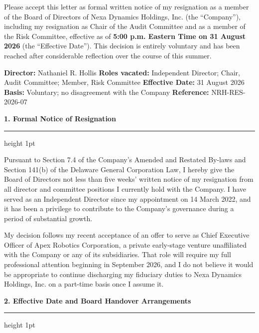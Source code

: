 \documentclass[english,11pt]{g-brief}
\newcommand{\lettersection}[1]{%
  \vspace{2.5mm}%
  {\color{BoardNavy}\Large\bfseries #1}\par%
  \vspace{0.5mm}%
  {\color{BrassGold}\hrule height 1pt}\par%
  \vspace{1.5mm}%
}
\begin{document}
\begin{g-brief}

Please accept this letter as formal written notice of my resignation as a member of the Board of Directors of Nexa Dynamics Holdings, Inc. (the ``Company''), including my resignation as Chair of the Audit Committee and as a member of the Risk Committee, effective as of \textbf{5:00 p.m. Eastern Time on 31 August 2026} (the ``Effective Date''). This decision is entirely voluntary and has been reached after considerable reflection over the course of this summer.

\vspace{2.5mm}
\begin{tcolorbox}[
    colback=ParchmentBG,
    colframe=BoardNavy,
    boxrule=1pt,
    arc=1.5mm,
    top=2.5mm,
    bottom=2.5mm,
    left=3.5mm,
    right=3.5mm,
    title=\textcolor{white}{\small\faFile\ \textbf{Notice Summary --- For the Record}}
]
\textcolor{DarkText}{%
\textbf{Director:} Nathaniel R. Hollis \quad\textbullet\quad
\textbf{Roles vacated:} Independent Director; Chair, Audit Committee; Member, Risk Committee \quad\textbullet\quad
\textbf{Effective Date:} 31 August 2026 \quad\textbullet\quad
\textbf{Basis:} Voluntary; no disagreement with the Company \quad\textbullet\quad
\textbf{Reference:} NRH-RES-2026-07}
\end{tcolorbox}

\lettersection{1. Formal Notice of Resignation}

Pursuant to Section 7.4 of the Company's Amended and Restated By-laws and Section 141(b) of the Delaware General Corporation Law, I hereby give the Board of Directors not less than five weeks' written notice of my resignation from all director and committee positions I currently hold with the Company. I have served as an Independent Director since my appointment on 14 March 2022, and it has been a privilege to contribute to the Company's governance during a period of substantial growth.

My decision follows my recent acceptance of an offer to serve as Chief Executive Officer of Apex Robotics Corporation, a private early-stage venture unaffiliated with the Company or any of its subsidiaries. That role will require my full professional attention beginning in September 2026, and I do not believe it would be appropriate to continue discharging my fiduciary duties to Nexa Dynamics Holdings, Inc. on a part-time basis once I assume it.

\lettersection{2. Effective Date and Board Handover Arrangements}


\end{g-brief}
\end{document}
